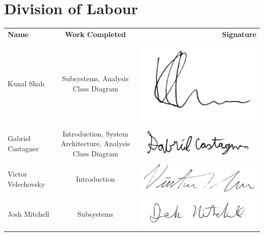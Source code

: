 \documentclass[]{article}
\begin{document}
\appendix
\newpage
\section{Division of Labour}
\label{sec:division_of_labour}

\begin{tabular}{l c r}
    \textbf{Name} & \textbf{Work Completed} & \textbf{Signature} \\
    
    Kunal Shah & Subsystems, Analysis Class Diagram & 
    \includegraphics[scale=0.2]{../Resources/Signature/Kunal-Sig.png} \\
    
    Gabriel Castagner & Introduction, System Architecture, Analysis Class Diagram &
    \includegraphics[scale=0.2]{../Resources/Signature/Gabe-Sig.png} \\
    
    Victor Velechovsky & Introduction & 
    \includegraphics[scale=0.3]{../Resources/Signature/Vic-Sig.png} \\
    
    Josh Mitchell & Subsystems & 
    \includegraphics[scale=0.2]{../Resources/Signature/Josh-Sig.png} \\
\end{tabular}
\end{document}
